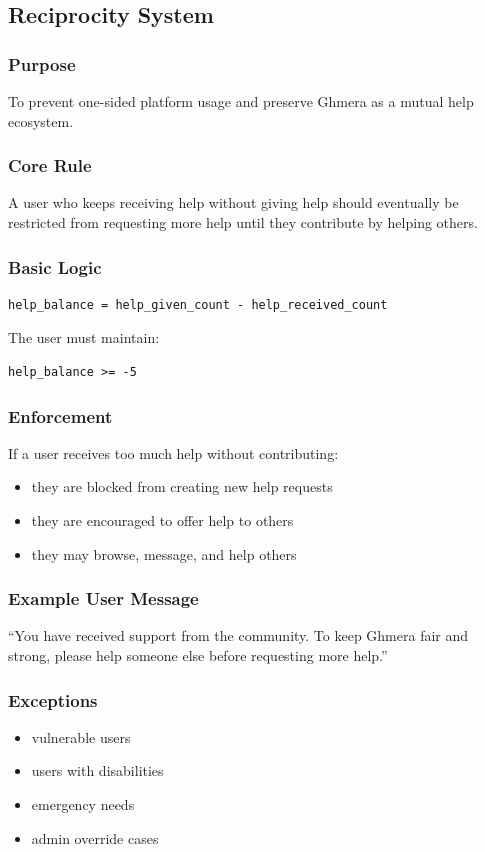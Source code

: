 \documentclass[11pt]{article}
\begin{document}
\subsection{Reciprocity System}

\subsubsection{Purpose}
To prevent one-sided platform usage and preserve Ghmera as a mutual help ecosystem.

\subsubsection{Core Rule}
A user who keeps receiving help without giving help should eventually be restricted from requesting more help until they contribute by helping others.

\subsubsection{Basic Logic}
\begin{verbatim}
help_balance = help_given_count - help_received_count
\end{verbatim}

The user must maintain:
\begin{verbatim}
help_balance >= -5
\end{verbatim}

\subsubsection{Enforcement}
If a user receives too much help without contributing:
\begin{itemize}[leftmargin=1.5em]
    \item they are blocked from creating new help requests
    \item they are encouraged to offer help to others
    \item they may browse, message, and help others
\end{itemize}

\subsubsection{Example User Message}
``You have received support from the community. To keep Ghmera fair and strong, please help someone else before requesting more help.''

\subsubsection{Exceptions}
\begin{itemize}[leftmargin=1.5em]
    \item vulnerable users
    \item users with disabilities
    \item emergency needs
    \item admin override cases
\end{itemize}
\end{document}
